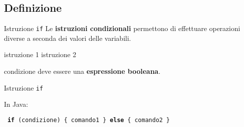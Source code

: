 \subsection[Definizione]{Definizione}

\begin{frame}{Istruzione \texttt{if}}
     Le \textbf{istruzioni condizionali} permettono di effettuare operazioni diverse a seconda 
     dei valori delle variabili.
    \begin{algorithmic}[1]
	\State istruzione 1
      \Else
	\State istruzione 2
      \EndIf
    \end{algorithmic}
    \alert{condizione} deve essere una \textbf{espressione booleana}.
\end{frame}


\begin{frame}{Istruzione \texttt{if}}
    
    In Java: \\
    \begin{center}
      \texttt{     
	\textbf{if} (\alert{condizione}) \{ \newline
	      comando1 \newline
	    \} \textbf{else} \{ \newline
	      comando2 \newline
	    \} \newline}
    \end{center}

\end{frame}